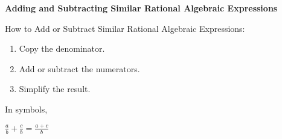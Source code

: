 \begin{center}
\textbf{Adding and Subtracting Similar Rational Algebraic Expressions}
\end{center}

\vspace*{1ex}

How to Add or Subtract Similar Rational Algebraic Expressions:
\begin{enumerate}[label = \arabic*. ]
\item Copy the denominator. 
\item Add or subtract the numerators.  
\item Simplify the result. 
\end{enumerate}

\vspce

In symbols, 

\begin{center}
$\displaystyle  \frac{a}{b} +  \frac{c}{b} =  \frac{a+c}{b}$ 
\end{center}

